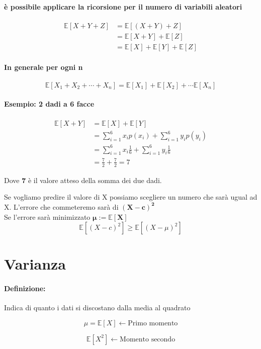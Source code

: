 \documentclass[]{article}
\newcommand{\ev}{\mathbb{E}[X]}
\renewcommand{\ev}[1]{\mathbb{E}[#1]}
\newcommand{\definizione}{\paragraph{Definizione:}}
\begin{document}
    \paragraph{è possibile applicare la ricorsione per il numero di variabili aleatori}
    \begin{equation*}
        \begin{split}
            \ev{X + Y + Z} &= \ev{(X + Y) + Z} \\
            & = \ev{X + Y} + \ev{Z} \\
            & = \ev{X} + \ev{Y} + \ev{Z}
        \end{split}
    \end{equation*}

    \paragraph{In generale per ogni n}
    \[ \ev{X_1 + X_2 + \cdots + X_n} = \ev{X_1} + \ev{X_2} + \cdots \ev{X_n} \]


    \paragraph{Esempio: 2 dadi a 6 facce}
    \begin{equation*}
      \begin{split}
        \ev{X + Y} & = \ev{X} + \ev{Y} \\
        & = \sum_{i = 1}^{6} x_i p(x_i) + \sum_{i = 1}^{6} y_i p(y_i) \\
        & = \sum_{i = 1}^{6} x_i \frac{1}{6} + \sum_{i = 1}^{6} y_i \frac{1}{6} \\
        & = \frac{7}{2} + \frac{7}{2} = 7 
      \end{split}  
    \end{equation*}
    
    \centerline{Dove \textbf{7} è il valore atteso della somma dei due dadi.}
    Se vogliamo predire il valore di X possiamo scegliere un numero che sarà ugual ad X.
    L'errore che commeteremo sarà di $\boldsymbol{(X - c)^2}$ \\

    Se \boldsymbol{$c = \ev{X}$} l'errore sarà minimizzato $\boldsymbol{\mu := \ev{X}}$
    \[ \ev{(X - c)^2} \geq \ev{(X - \mu)^2}\]

    \section{Varianza}
    \definizione Indica di quanto i dati si discostano dalla media al quadrato \\
    \begin{minipage}{0.45\textwidth}
        \[ \mu = \ev{X} \leftarrow \text{Primo momento}\]
    \end{minipage}
    \begin{minipage}{0.45\textwidth}
        \[ \ev{X^2} \leftarrow \text{Momento secondo}\]
    \end{minipage}
\end{document}
